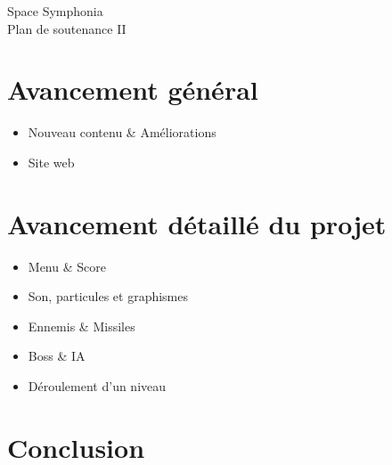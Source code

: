 \documentclass[12pt,a4paper]{article}
\title{}
\author{}
\date{}
\begin{document}
	\begin{center}
		\Huge{Space Symphonia} \\
		\Large{Plan de soutenance II}
	\end{center}
	\vspace{2cm}
	\section{Avancement général}
		\begin{itemize}
			\item Nouveau contenu \& Améliorations
			\item Site web
		\end{itemize}
	
	\section{Avancement détaillé du projet}
		\begin{itemize}
			\item Menu \& Score
			\item Son, particules et graphismes
			\item Ennemis \& Missiles
			\item Boss \& IA
			\item Déroulement d'un niveau
		\end{itemize}
	\section{Conclusion}
\end{document}
